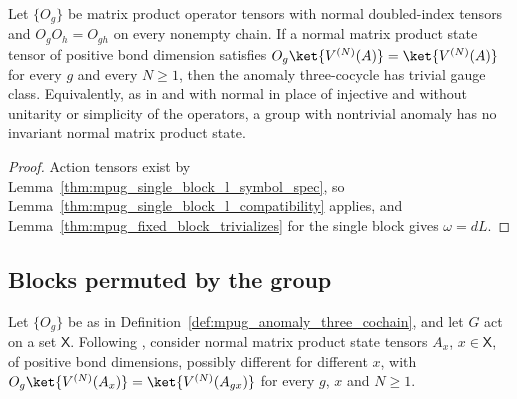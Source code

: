 \begin{theorem}
    \label{thm:mpug_anomaly_obstruction}
    \leanok
    Let $\{O_g\}$ be matrix product operator tensors with normal
    doubled-index tensors and $O_gO_h=O_{gh}$ on every nonempty chain. If a
    normal matrix product state tensor of positive bond dimension satisfies
    $O_g\ket{V^{(N)}(A)}=\ket{V^{(N)}(A)}$ for every $g$ and every $N\geq1$, then
    the anomaly three-cocycle has trivial gauge class. Equivalently, as in
    \cite[line~1545]{FrancoRubio2025MPUGauging} and
    \cite[line~738]{GarreRubio2023MPOSym} with normal in place of injective
    and without unitarity or simplicity of the operators, a group with
    nontrivial anomaly has no invariant normal matrix product state.
\end{theorem}

\begin{proof}\leanok
    Action tensors exist by
    Lemma~\ref{thm:mpug_single_block_l_symbol_spec}, so
    Lemma~\ref{thm:mpug_single_block_l_compatibility} applies, and Lemma~\ref{thm:mpug_fixed_block_trivializes} for the
    single block gives $\omega=dL$.
\end{proof}

\subsection{Blocks permuted by the group}

Let $\{O_g\}$ be as in Definition~\ref{def:mpug_anomaly_three_cochain}, and
let $G$ act on a set $\mathsf X$. Following
\cite[line~1064]{GarreRubio2023MPOSym}, consider normal matrix product
state tensors $A_x$, $x\in\mathsf X$, of positive bond dimensions, possibly
different for different $x$, with
$O_g\ket{V^{(N)}(A_x)}=\ket{V^{(N)}(A_{gx})}$ for every $g$, $x$ and
$N\geq1$.

